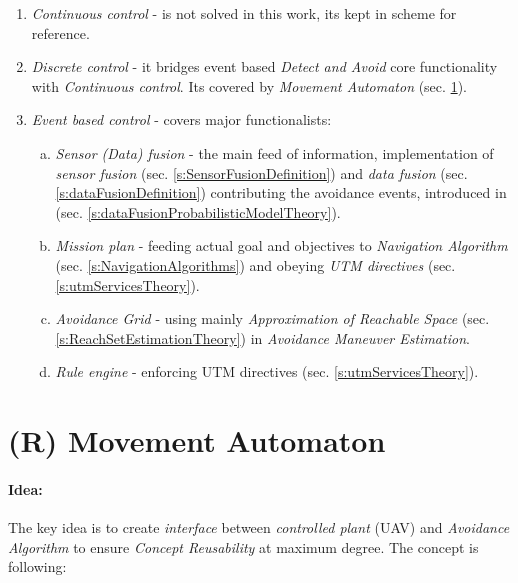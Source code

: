 \begin{enumerate}
    \item \emph{Continuous control} - is not solved in this work, its kept in scheme for reference. 
    
    \item \emph{Discrete control} - it bridges event based \emph{Detect and Avoid} core functionality with \emph{Continuous control}. Its covered by \emph{Movement Automaton} (sec. \ref{s:movementAutomatonTheory}).

   
    \item \emph{Event based control} - covers major functionalists:    
    \begin{enumerate}[a.]
        \item \emph{Sensor (Data) fusion} - the main feed of information, implementation of \emph{sensor fusion} (sec. \ref{s:SensorFusionDefinition}) and \emph{data fusion} (sec. \ref{s:dataFusionDefinition}) contributing the avoidance events, introduced in (sec. \ref{s:dataFusionProbabilisticModelTheory}).
        
        \item \emph{Mission plan} - feeding actual goal and objectives to \emph{Navigation Algorithm} (sec. \ref{s:NavigationAlgorithms}) and obeying \emph{UTM directives} (sec. \ref{s:utmServicesTheory}).
        
        \item \emph{Avoidance Grid}  - using mainly \emph{Approximation of Reachable Space} (sec. \ref{s:ReachSetEstimationTheory}) in \emph{Avoidance Maneuver Estimation}.
        
        \item \emph{Rule engine} - enforcing UTM directives (sec. \ref{s:utmServicesTheory}).
    \end{enumerate}
    
\end{enumerate}

\section{(R) Movement Automaton}\label{s:movementAutomatonTheory}

\paragraph{Idea:} The key idea is to create \emph{interface} between \emph{controlled plant} (UAV) and \emph{Avoidance Algorithm} to ensure \emph{Concept Reusability} at maximum degree.  The concept is following:

